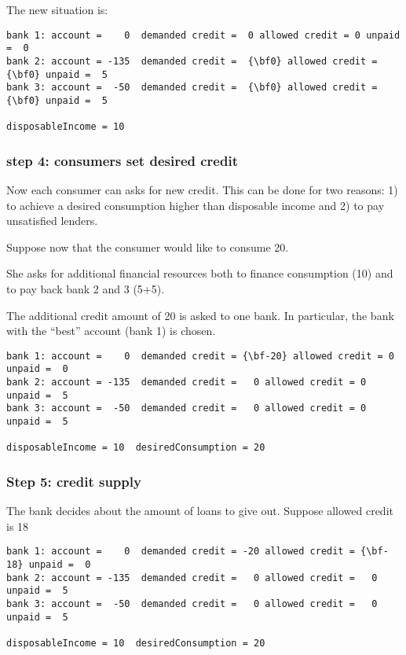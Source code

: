 \documentclass{article}
\begin{document}
The new situation is:

\begin{Verbatim}[commandchars=\\\{\}]
bank 1: account =    0  demanded credit =  0 allowed credit = 0 unpaid =  0
bank 2: account = -135  demanded credit =  {\bf0} allowed credit = {\bf0} unpaid =  5
bank 3: account =  -50  demanded credit =  {\bf0} allowed credit = {\bf0} unpaid =  5

disposableIncome = 10
\end{Verbatim}




\subsubsection*{step 4: consumers set desired credit}
Now each consumer can asks for new credit. This can be done for two reasons: 1) to achieve a desired consumption higher than disposable income and 2) to pay unsatisfied lenders.

Suppose now that the consumer would like to consume 20.

She asks for additional financial resources both to finance consumption (10) and to pay back bank 2 and 3 (5+5).

The additional credit amount of 20 is asked to one bank. In particular, the bank with the ``best'' account (bank 1) is chosen. 

\begin{Verbatim}[commandchars=\\\{\}]
bank 1: account =    0  demanded credit = {\bf-20} allowed credit = 0 unpaid =  0
bank 2: account = -135  demanded credit =   0 allowed credit = 0 unpaid =  5
bank 3: account =  -50  demanded credit =   0 allowed credit = 0 unpaid =  5

disposableIncome = 10  desiredConsumption = 20
\end{Verbatim}


\subsubsection*{Step 5: credit supply}


The bank decides about the amount of loans to give out.
Suppose allowed credit is 18

\begin{Verbatim}[commandchars=\\\{\}]
bank 1: account =    0  demanded credit = -20 allowed credit = {\bf-18} unpaid =  0
bank 2: account = -135  demanded credit =   0 allowed credit =   0 unpaid =  5
bank 3: account =  -50  demanded credit =   0 allowed credit =   0 unpaid =  5

disposableIncome = 10  desiredConsumption = 20
\end{Verbatim}
\end{document}
